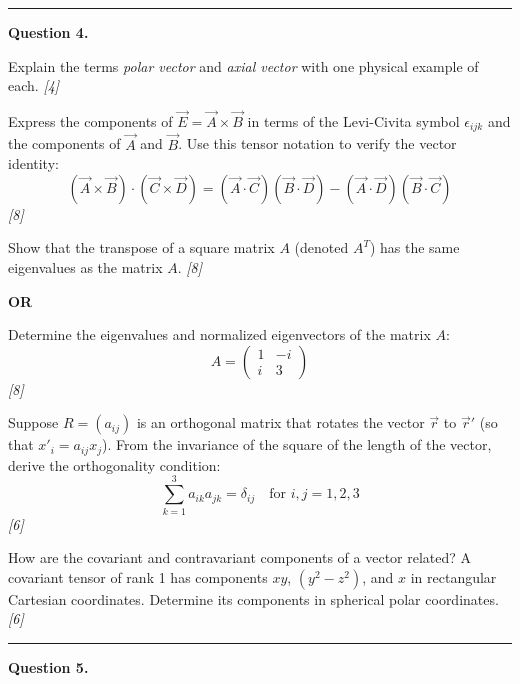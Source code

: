 \documentclass[11pt,a4paper]{article}
\newcommand{\pts}[1]{\hfill   \textit{[#1]}}
\begin{document}
\medskip\rule{\linewidth}{0.2pt}




\noindent   \textbf{Question 4.}

\begin{parts}
  \item Explain the terms   \textit{polar vector} and   \textit{axial vector} with one physical example of each. \pts{4}
  \item Express the components of $\vec{E} = \vec{A}  \times \vec{B}$ in terms of the Levi-Civita symbol $\epsilon_{ijk}$ and the components of $\vec{A}$ and $\vec{B}$. Use this tensor notation to verify the vector identity:
    \[ (\vec{A}  \times \vec{B}) \cdot (\vec{C}  \times \vec{D}) = (\vec{A} \cdot \vec{C})(\vec{B} \cdot \vec{D}) - (\vec{A} \cdot \vec{D})(\vec{B} \cdot \vec{C}) \] \pts{8}
  \item Show that the transpose of a square matrix $A$ (denoted $A^T$) has the same eigenvalues as the matrix $A$. \pts{8}
\end{parts}
\hfill   \textbf{OR}

\begin{parts}
  \item Determine the eigenvalues and normalized eigenvectors of the matrix $A$:
    \[ A = 
\begin{pmatrix} 1 & -i \\ i & 3 \end{pmatrix} \] \pts{8}
  \item Suppose $R = (a_{ij})$ is an orthogonal matrix that rotates the vector $\vec{r}$ to $\vec{r}'$ (so that $x'_i = a_{ij} x_j$). From the invariance of the square of the length of the vector, derive the orthogonality condition:
    \[ \sum_{k=1}^3 a_{ik} a_{jk} = \delta_{ij} \quad  \text{for } i,j = 1,2,3 \] \pts{6}
  \item How are the covariant and contravariant components of a vector related? A covariant tensor of rank 1 has components $xy$, $(y^2 - z^2)$, and $x$ in rectangular Cartesian coordinates. Determine its components in spherical polar coordinates. \pts{6}
\end{parts}

\medskip\rule{\linewidth}{0.2pt}




\noindent   \textbf{Question 5.}
\end{document}
